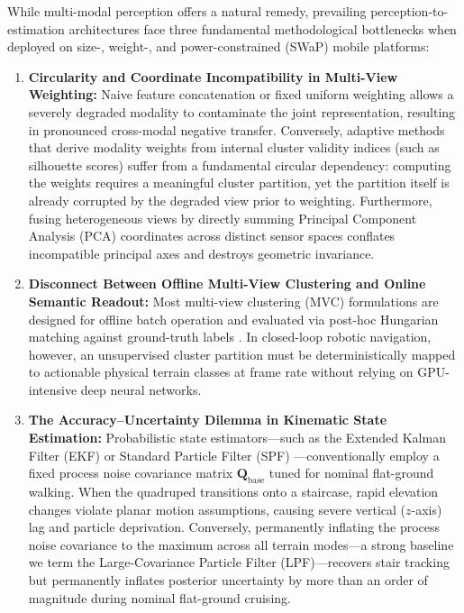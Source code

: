 \documentclass[11pt, a4paper]{article}
\begin{document}
While multi-modal perception offers a natural remedy, prevailing perception-to-estimation architectures face three fundamental methodological bottlenecks when deployed on size-, weight-, and power-constrained (SWaP) mobile platforms:
\begin{enumerate}
    \item \textbf{Circularity and Coordinate Incompatibility in Multi-View Weighting:} Naive feature concatenation or fixed uniform weighting allows a severely degraded modality to contaminate the joint representation, resulting in pronounced cross-modal negative transfer. Conversely, adaptive methods that derive modality weights from internal cluster validity indices (such as silhouette scores) suffer from a fundamental circular dependency: computing the weights requires a meaningful cluster partition, yet the partition itself is already corrupted by the degraded view prior to weighting. Furthermore, fusing heterogeneous views by directly summing Principal Component Analysis (PCA) coordinates across distinct sensor spaces conflates incompatible principal axes and destroys geometric invariance.
    \item \textbf{Disconnect Between Offline Multi-View Clustering and Online Semantic Readout:} Most multi-view clustering (MVC) formulations are designed for offline batch operation and evaluated via post-hoc Hungarian matching against ground-truth labels \cite{wang2024self, chowdhury2025deep}. In closed-loop robotic navigation, however, an unsupervised cluster partition must be deterministically mapped to actionable physical terrain classes at frame rate without relying on GPU-intensive deep neural networks.
    \item \textbf{The Accuracy--Uncertainty Dilemma in Kinematic State Estimation:} Probabilistic state estimators—such as the Extended Kalman Filter (EKF) or Standard Particle Filter (SPF) \cite{thrun2005probabilistic}—conventionally employ a fixed process noise covariance matrix $\mathbf{Q}_{\text{base}}$ tuned for nominal flat-ground walking. When the quadruped transitions onto a staircase, rapid elevation changes violate planar motion assumptions, causing severe vertical ($z$-axis) lag and particle deprivation. Conversely, permanently inflating the process noise covariance to the maximum across all terrain modes—a strong baseline we term the Large-Covariance Particle Filter (LPF)—recovers stair tracking but permanently inflates posterior uncertainty by more than an order of magnitude during nominal flat-ground cruising.
\end{enumerate}
\end{document}
